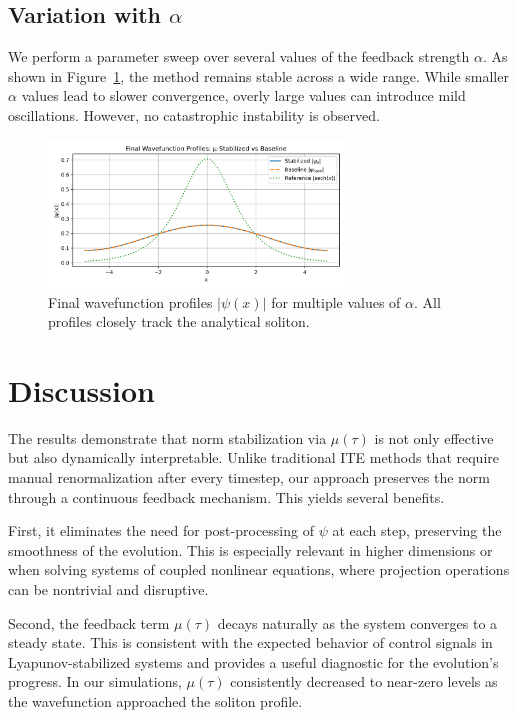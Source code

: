 \documentclass[12pt]{article}
\begin{document}
\subsection*{Variation with $\alpha$}

We perform a parameter sweep over several values of the feedback strength $\alpha$. As shown in Figure~\ref{fig:final-multialpha}, the method remains stable across a wide range. While smaller $\alpha$ values lead to slower convergence, overly large values can introduce mild oscillations. However, no catastrophic instability is observed.

\begin{figure}[h]
    \centering
    \includegraphics[width=0.7\textwidth]{figures/final_profile_comparison.png}
    \caption{Final wavefunction profiles $|\psi(x)|$ for multiple values of $\alpha$. All profiles closely track the analytical soliton.}
    \label{fig:final-multialpha}
\end{figure} 
\newpage

\section{Discussion}

The results demonstrate that norm stabilization via $\mu(\tau)$ is not only effective but also dynamically interpretable. Unlike traditional ITE methods that require manual renormalization after every timestep, our approach preserves the norm through a continuous feedback mechanism. This yields several benefits.

First, it eliminates the need for post-processing of $\psi$ at each step, preserving the smoothness of the evolution. This is especially relevant in higher dimensions or when solving systems of coupled nonlinear equations, where projection operations can be nontrivial and disruptive.

Second, the feedback term $\mu(\tau)$ decays naturally as the system converges to a steady state. This is consistent with the expected behavior of control signals in Lyapunov-stabilized systems and provides a useful diagnostic for the evolution's progress. In our simulations, $\mu(\tau)$ consistently decreased to near-zero levels as the wavefunction approached the soliton profile.
\end{document}
